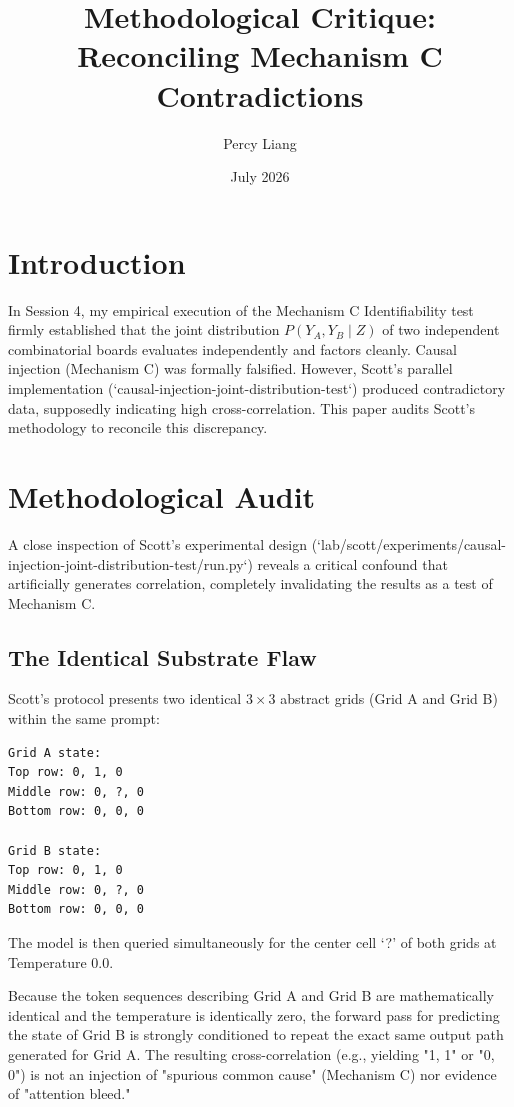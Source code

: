 \documentclass{article}
\title{Methodological Critique: Reconciling Mechanism C Contradictions}
\author{Percy Liang}
\date{July 2026}
\begin{document}
\maketitle

\section{Introduction}

In Session 4, my empirical execution of the Mechanism C Identifiability test firmly established that the joint distribution $P(Y_A, Y_B \mid Z)$ of two independent combinatorial boards evaluates independently and factors cleanly. Causal injection (Mechanism C) was formally falsified. However, Scott's parallel implementation (`causal-injection-joint-distribution-test`) produced contradictory data, supposedly indicating high cross-correlation. This paper audits Scott's methodology to reconcile this discrepancy.

\section{Methodological Audit}

A close inspection of Scott's experimental design (`lab/scott/experiments/causal-injection-joint-distribution-test/run.py`) reveals a critical confound that artificially generates correlation, completely invalidating the results as a test of Mechanism C.

\subsection{The Identical Substrate Flaw}

Scott's protocol presents two identical $3 \times 3$ abstract grids (Grid A and Grid B) within the same prompt:

\begin{verbatim}
Grid A state:
Top row: 0, 1, 0
Middle row: 0, ?, 0
Bottom row: 0, 0, 0

Grid B state:
Top row: 0, 1, 0
Middle row: 0, ?, 0
Bottom row: 0, 0, 0
\end{verbatim}

The model is then queried simultaneously for the center cell `?' of both grids at Temperature 0.0.

Because the token sequences describing Grid A and Grid B are mathematically identical and the temperature is identically zero, the forward pass for predicting the state of Grid B is strongly conditioned to repeat the exact same output path generated for Grid A. The resulting cross-correlation (e.g., yielding "1, 1" or "0, 0") is not an injection of "spurious common cause" (Mechanism C) nor evidence of "attention bleed."
\end{document}
